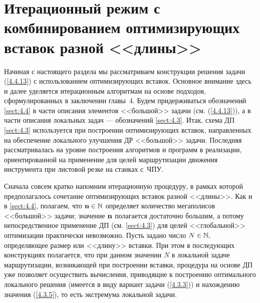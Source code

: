 
\section{
  Итерационный режим с комбинированием оптимизирующих вставок разной <<длины>>
}
\label{sect:5.3}
\setcounter{equation}{0}

Начиная с настоящего раздела мы рассматриваем конструкции решения задачи
(\ref{4.4.13})
с использованием оптимизирующих вставок.
Основное внимание здесь и далее уделяется итерационным алгоритмам на основе подходов,
сформулированных в заключении главы~4.
Будем придерживаться обозначений \ref{sect:4.4}
в части описания элементов <<большой>> задачи
(см. (\ref{4.4.13})),
а в части описания локальных задач --- обозначений
\ref{sect:4.3}.
Итак, схема ДП \ref{sect:4.3} используется при построении
оптимизирующих вставок,
направленных на обеспечение локального улучшения
ДР <<большой>> задачи.
Последняя рассматривалась на уровне построения
алгоритмов и программ в реализации,
ориентированной на применение для
целей маршрутизации движения инструмента при листовой резке на станках
с~ЧПУ.

Сначала совсем кратко напомним итерационную процедуру,
в рамках которой предполагалось сочетание оптимизирующих вставок разной <<длины>>.
Как и в \ref{sect:4.4},
полагаем, что ${\mathbf n}\in {\mathbb N}$
определяет количество мегаполисов <<большой>> задачи;
значение ${\mathbf n}$ полагается достаточно большим,
а потому непосредственное применение ДП
(см. \ref{sect:4.3})
для целей <<глобальной>> оптимизации практически невозможно.
Пусть задано число
$N\in {\mathbb N},$
определяющее размер или <<длину>> вставки.
При этом в последующих конструкциях полагается,
что при данном значении $N$
в локальной задаче маршрутизации,
возникающей при построении вставки,
процедура на основе ДП уже позволяет осуществить вычисления,
приводящие к построению оптимального локального решения
(имеется в виду вариант задачи (\ref{4.3.3}))
и нахождению значения (\ref{4.3.5}),
то есть экстремума локальной задачи.

